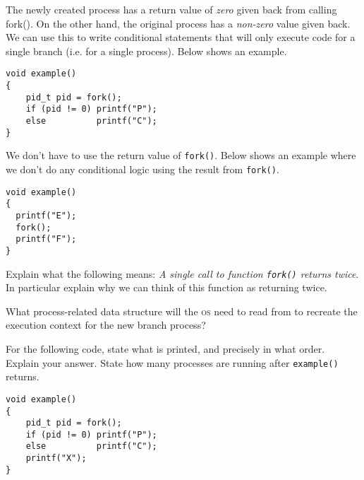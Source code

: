 The newly created process has a return value of \textit{zero} given back 
from calling fork(). On the other hand, the original process has a \textit{non-zero} 
value given back. We can use this to write conditional statements 
that will only execute code for a single branch (i.e. for a single process). 
Below shows an example.

\frmrule





\begin{example}
\begin{lstlisting}
void example()
{
	pid_t pid = fork();
	if (pid != 0) printf("P");
	else          printf("C");
}
\end{lstlisting}
\end{example}

\frmrule

We don't have to use the return value of \lstinline{fork()}. 
Below shows an example where we don't do any 
conditional logic using the result from \lstinline{fork()}.

\begin{example}
\begin{lstlisting}
void example()
{
  printf("E");
  fork();
  printf("F");
}
\end{lstlisting}
\end{example}


\frmrule


\begin{example}
Explain what the following 
means: \textit{A single call to function \lstinline{fork()} returns twice}.
In particular explain why we can think of this function as returning 
twice. 
\end{example}

\frmrule

\begin{example}
What process-related data structure will the \textsc{os} need to read from 
to recreate the execution context for the new branch process?
\end{example}

\frmrule


\begin{example}
For the following code, state what is printed, and precisely in what order.
Explain your answer. State how many processes are running 
after \lstinline{example()} returns.
\begin{lstlisting}
void example()
{
	pid_t pid = fork();
	if (pid != 0) printf("P");
	else          printf("C");
	printf("X");
}
\end{lstlisting}
\end{example}

